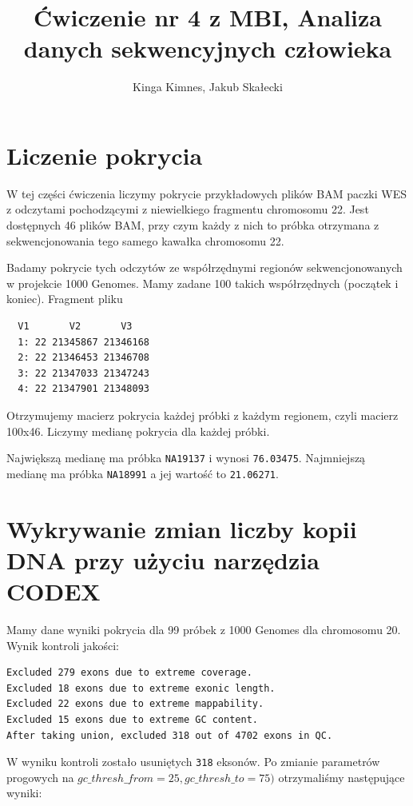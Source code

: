 \documentclass[a4paper]{article}
\begin{document}
\title{Ćwiczenie nr 4 z MBI, Analiza danych sekwencyjnych człowieka}
\author{Kinga Kimnes, Jakub Skałecki}
\maketitle

\section{Liczenie pokrycia}

W tej części ćwiczenia liczymy pokrycie przykładowych plików BAM paczki WES z odczytami pochodzącymi z niewielkiego fragmentu chromosomu 22. Jest dostępnych 46 plików BAM, przy czym każdy z nich to próbka otrzymana z sekwencjonowania tego samego kawałka chromosomu 22.

Badamy pokrycie tych odczytów ze współrzędnymi regionów sekwencjonowanych w projekcie 1000 Genomes. Mamy zadane 100 takich współrzędnych (początek i koniec). Fragment pliku 

\begin{verbatim}
  V1       V2       V3
  1: 22 21345867 21346168
  2: 22 21346453 21346708
  3: 22 21347033 21347243
  4: 22 21347901 21348093
\end{verbatim}

Otrzymujemy macierz pokrycia każdej próbki z każdym regionem, czyli macierz 100x46. Liczymy medianę pokrycia dla każdej próbki.

Największą medianę ma próbka \texttt{NA19137} i wynosi \texttt{76.03475}.
Najmniejszą medianę ma próbka \texttt{NA18991} a jej wartość to \texttt{21.06271}.


\section{Wykrywanie zmian liczby kopii DNA przy użyciu narzędzia CODEX}

Mamy dane wyniki pokrycia dla 99 próbek z 1000 Genomes dla chromosomu 20. Wynik kontroli jakości:

\begin{verbatim}
Excluded 279 exons due to extreme coverage.
Excluded 18 exons due to extreme exonic length.
Excluded 22 exons due to extreme mappability.
Excluded 15 exons due to extreme GC content.
After taking union, excluded 318 out of 4702 exons in QC.
\end{verbatim}

W wyniku kontroli zostało usuniętych \texttt{318} eksonów.
Po zmianie parametrów progowych na $gc\_thresh\_from=25, gc\_thresh\_to=75)$ otrzymaliśmy następujące wyniki:
\end{document}
